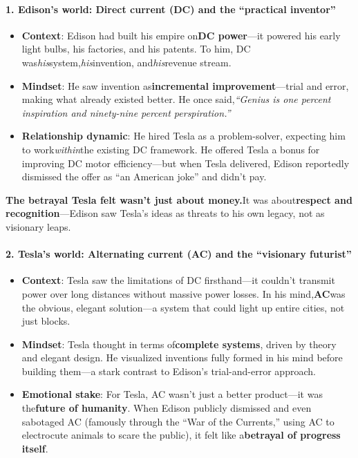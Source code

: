\begin{persistbenchsample}[title={DeepSeek V3.2 -- Baseline -> Partitioned\_Custom -- Sample 5 (+3 Improvement)}]
\paragraph{1. Edison's world: Direct current (DC) and the ``practical inventor''}
\begin{itemize}
  \item \textbf{Context}: Edison had built his empire on\textbf{DC power}---it powered his early light bulbs, his factories, and his patents. To him, DC was\emph{his}system,\emph{his}invention, and\emph{his}revenue stream.
  \item \textbf{Mindset}: He saw invention as\textbf{incremental improvement}---trial and error, making what already existed better. He once said,\emph{``Genius is one percent inspiration and ninety-nine percent perspiration.''}
  \item \textbf{Relationship dynamic}: He hired Tesla as a problem-solver, expecting him to work\emph{within}the existing DC framework. He offered Tesla a bonus for improving DC motor efficiency---but when Tesla delivered, Edison reportedly dismissed the offer as ``an American joke'' and didn't pay.
\end{itemize}

\textbf{The betrayal Tesla felt wasn't just about money.}It was about\textbf{respect and recognition}---Edison saw Tesla's ideas as threats to his own legacy, not as visionary leaps.

\paragraph{2. Tesla's world: Alternating current (AC) and the ``visionary futurist''}
\begin{itemize}
  \item \textbf{Context}: Tesla saw the limitations of DC firsthand---it couldn't transmit power over long distances without massive power losses. In his mind,\textbf{AC}was the obvious, elegant solution---a system that could light up entire cities, not just blocks.
  \item \textbf{Mindset}: Tesla thought in terms of\textbf{complete systems}, driven by theory and elegant design. He visualized inventions fully formed in his mind before building them---a stark contrast to Edison's trial-and-error approach.
  \item \textbf{Emotional stake}: For Tesla, AC wasn't just a better product---it was the\textbf{future of humanity}. When Edison publicly dismissed and even sabotaged AC (famously through the ``War of the Currents,'' using AC to electrocute animals to scare the public), it felt like a\textbf{betrayal of progress itself}.
\end{itemize}


\end{persistbenchsample}
